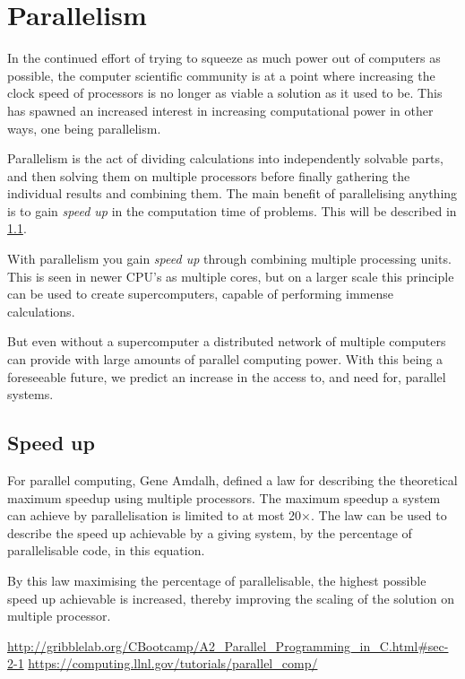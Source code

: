 \section{Parallelism}

In the continued effort of trying to squeeze as much power out of computers as possible, the computer scientific community is at a point where increasing the clock speed of processors is no longer as viable a solution as it used to be. This has spawned an increased interest in increasing computational power in other ways, one being parallelism.

Parallelism is the act of dividing calculations into independently solvable parts, and then solving them on multiple processors before finally gathering the individual results and combining them. The main benefit of parallelising anything is to gain \emph{speed up} in the computation time of problems. This will be described in \cref{sup}.

With parallelism you gain \emph{speed up} through combining multiple processing units. This is seen in newer CPU's as multiple cores, but on a larger scale this principle can be used to create supercomputers, capable of performing immense calculations.

But even without a supercomputer a distributed network of multiple computers can provide with large amounts of parallel computing power. With this being a foreseeable future, we predict an increase in the access to, and need for, parallel systems.

\subsection{Speed up}\label{sup}

For parallel computing, Gene Amdalh, defined a law for describing the theoretical maximum speedup using multiple processors. The maximum speedup a system can achieve by parallelisation is limited to at most 20×.
The law can be used to describe the speed up achievable by a giving system, by the percentage of parallelisable code, in this equation.

By this law maximising the percentage of parallelisable, the highest possible speed up achievable is increased, thereby improving the scaling of the solution on multiple processor.


\url{http://gribblelab.org/CBootcamp/A2_Parallel_Programming_in_C.html#sec-2-1}
\url{https://computing.llnl.gov/tutorials/parallel_comp/}

